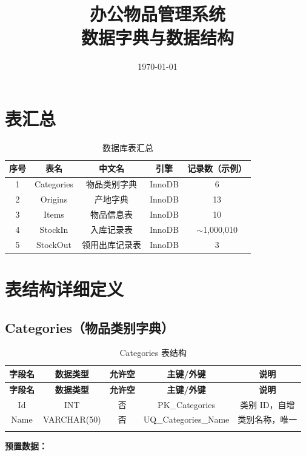 \documentclass[12pt,a4paper]{ctexart}
\title{\textbf{办公物品管理系统\\数据字典与数据结构}}
\author{}
\date{\today}
\begin{document}
\maketitle
\tableofcontents
\newpage

\section{表汇总}

\begin{table}[h]
\centering
\begin{tabular}{c|c|c|c|c}
\toprule
\textbf{序号} & \textbf{表名} & \textbf{中文名} & \textbf{引擎} & \textbf{记录数（示例）} \\
\midrule
1 & Categories & 物品类别字典 & InnoDB & 6 \\
2 & Origins & 产地字典 & InnoDB & 13 \\
3 & Items & 物品信息表 & InnoDB & 10 \\
4 & StockIn & 入库记录表 & InnoDB & $\sim$1,000,010 \\
5 & StockOut & 领用出库记录表 & InnoDB & 3 \\
\bottomrule
\end{tabular}
\caption{数据库表汇总}
\end{table}

\section{表结构详细定义}

\subsection{Categories（物品类别字典）}

\begin{longtable}{c|c|c|c|c}
\toprule
\textbf{字段名} & \textbf{数据类型} & \textbf{允许空} & \textbf{主键/外键} & \textbf{说明} \\
\midrule
\endfirsthead
\toprule
\textbf{字段名} & \textbf{数据类型} & \textbf{允许空} & \textbf{主键/外键} & \textbf{说明} \\
\midrule
\endhead
Id   & INT & 否 & PK\_Categories & 类别 ID，自增 \\
Name & VARCHAR(50) & 否 & UQ\_Categories\_Name & 类别名称，唯一 \\
\bottomrule
\caption{Categories 表结构}
\end{longtable}

\vspace{4pt}
\textbf{预置数据：}
\end{document}
